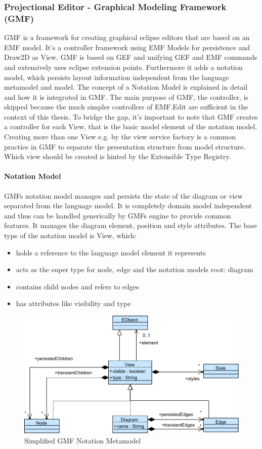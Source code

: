 \subsubsection {Projectional Editor - Graphical Modeling Framework (GMF)}
GMF is a framework for creating graphical eclipse editors that are based on an EMF model. It's a controller framework using EMF Models for persistence and Draw2D as View. GMF is based on GEF and unifying GEF and EMF commands and extensively uses eclipse extension points. Furthermore it adds a notation model, which persists layout information independent from the language metamodel and model. The concept of a Notation Model is explained in detail and how it is integrated in GMF. The main purpose of GMF, the controller, is skipped because the much simpler controllers of EMF.Edit are sufficient in the context of this thesis. To bridge the gap, it's important to note that GMF creates a controller for each View, that is the basic model element of the notation model. Creating more than one View e.g. by the view service factory is a common practice in GMF to separate the presentation structure from model structure. Which view should be created is hinted by the Extensible Type Registry.

\paragraph{Notation Model}
GMFs notation model manages and persists the state of the diagram or view separated from the language model. It is completely domain model independent and thus can be handled generically by GMFs engine to provide common features. It manages the diagram element, position and style attributes. \cite{EMP} The base type of the notation model is View, which:
\begin{itemize}
	\item holds a reference to the language model element it represents 
	\item acts as the super type for node, edge and the notation models root: diagram
	\item contains child nodes and refers to edges
	\item has attributes like visibility and type
\end{itemize}

\begin{figure}
\centering
\includegraphics[scale=0.8]{gfx/ex/GMF_Notation} 
\caption{Simplified GMF Notation Metamodel}
\label{MM:GMF}
\end{figure}

